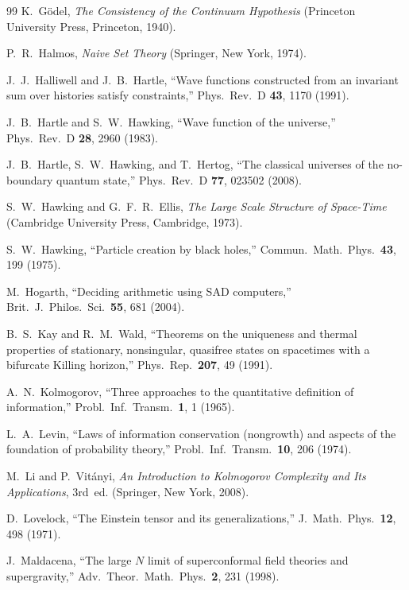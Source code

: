 \documentclass[11pt,a4paper]{article}
\theoremstyle{plain}
\theoremstyle{definition}
\theoremstyle{remark}
\begin{document}
\begin{thebibliography}{99}
K.~G\"odel,
\textit{The Consistency of the Continuum Hypothesis}
(Princeton University Press, Princeton, 1940).

P.~R.~Halmos,
\textit{Naive Set Theory}
(Springer, New York, 1974).

J.~J.~Halliwell and J.~B.~Hartle,
``Wave functions constructed from an invariant sum over histories satisfy constraints,''
Phys.\ Rev.\ D \textbf{43}, 1170 (1991).

J.~B.~Hartle and S.~W.~Hawking,
``Wave function of the universe,''
Phys.\ Rev.\ D \textbf{28}, 2960 (1983).

J.~B.~Hartle, S.~W.~Hawking, and T.~Hertog,
``The classical universes of the no-boundary quantum state,''
Phys.\ Rev.\ D \textbf{77}, 023502 (2008).

S.~W.~Hawking and G.~F.~R.~Ellis,
\textit{The Large Scale Structure of Space-Time}
(Cambridge University Press, Cambridge, 1973).

S.~W.~Hawking,
``Particle creation by black holes,''
Commun.\ Math.\ Phys.\ \textbf{43}, 199 (1975).

M.~Hogarth,
``Deciding arithmetic using SAD computers,''
Brit.\ J.\ Philos.\ Sci.\ \textbf{55}, 681 (2004).

B.~S.~Kay and R.~M.~Wald,
``Theorems on the uniqueness and thermal properties of stationary, nonsingular, quasifree states on spacetimes with a bifurcate Killing horizon,''
Phys.\ Rep.\ \textbf{207}, 49 (1991).

A.~N.~Kolmogorov,
``Three approaches to the quantitative definition of information,''
Probl.\ Inf.\ Transm.\ \textbf{1}, 1 (1965).

L.~A.~Levin,
``Laws of information conservation (nongrowth) and aspects of the foundation of probability theory,''
Probl.\ Inf.\ Transm.\ \textbf{10}, 206 (1974).

M.~Li and P.~Vit\'anyi,
\textit{An Introduction to Kolmogorov Complexity and Its Applications}, 3rd~ed.
(Springer, New York, 2008).

D.~Lovelock,
``The Einstein tensor and its generalizations,''
J.\ Math.\ Phys.\ \textbf{12}, 498 (1971).

J.~Maldacena,
``The large $N$ limit of superconformal field theories and supergravity,''
Adv.\ Theor.\ Math.\ Phys.\ \textbf{2}, 231 (1998).


\end{thebibliography}
\end{document}
